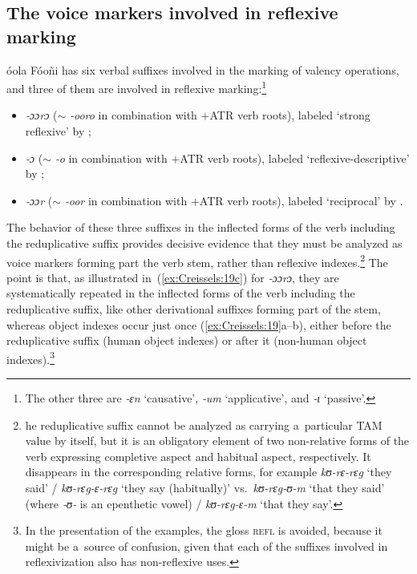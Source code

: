 \documentclass[output=paper]{langscibook}
\begin{document}
\subsection{The voice markers involved in reflexive marking}%
\label{sec:Creissels:voice-markers}

óola Fóoñi has six verbal suffixes involved in the marking of valency
operations, and three of them are involved in reflexive marking:\footnote{ The
  other three are \textit{‑ɛn} `causative', \textit{‑um} `applicative', and
  \textit{‑ɩ} `passive'. }

\begin{itemize}
\item \textit{‑ɔɔrɔ} ($\sim$ \textit{‑ooro} in combination with $+$ATR verb roots),
  labeled `strong reflexive' by \citet{Sapir1965};
\item \textit{‑ɔ} ($\sim$ \textit{‑o} in combination with $+$ATR verb roots),
  labeled `reflexive-descriptive' by \citet{Sapir1965};
\item \textit{‑ɔɔr} ($\sim$ \textit{‑oor} in combination with $+$ATR verb roots),
  labeled `reciprocal' by \citet{Sapir1965}.
\end{itemize}

The behavior of these three suffixes in the inflected forms of the verb
including the reduplicative suffix provides decisive evidence that they must be
analyzed as voice markers forming part the verb stem, rather than reflexive
indexes.\footnote{ he reduplicative suffix cannot be analyzed as carrying
  a~particular TAM value by itself, but it is an obligatory element of two
  non-relative forms of the verb expressing completive aspect and habitual
  aspect, respectively.  It disappears in the corresponding relative forms, for
  example \textit{kʊ-rɛ-rɛg} `they said' / \textit{kʊ-rɛg-ɛ-rɛg} `they say
  (habitually)' vs.\ \textit{kʊ-rɛg-ʊ-m} `that they said' (where \textit{‑ʊ‑} is an
  epenthetic vowel) / \textit{kʊ-rɛg-ɛ-m} `that they say'. } The point is that,
as illustrated in~(\ref{ex:Creissels:19c}) for \textit{‑ɔɔrɔ}, they are systematically
repeated in the inflected forms of the verb including the reduplicative suffix,
like other derivational suffixes forming part of the stem, whereas object
indexes occur just once (\ref{ex:Creissels:19}a--b), either before the reduplicative
suffix (human object indexes) or after it (non-human object indexes).\footnote{
  In the presentation of the examples, the gloss \textsc{refl} is avoided,
  because it might be a~source of confusion, given that each of the suffixes
  involved in reflexivization also has non-reflexive uses. }
\end{document}

